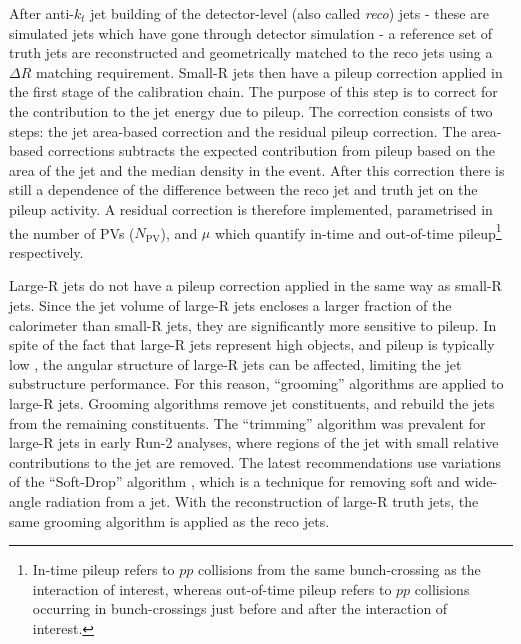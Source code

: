 After anti-$k_t$ jet building of the detector-level (also called \textit{reco}) jets - these are simulated jets which have gone through detector simulation - a reference set of truth jets are reconstructed and geometrically matched to the reco jets using a $\Delta R$ matching requirement. Small-R jets then have a pileup correction applied in the first stage of the calibration chain. The purpose of this step is to correct for the contribution to the jet energy due to pileup. The correction consists of two steps: the jet area-based correction and the residual pileup correction. The area-based corrections subtracts the expected contribution from pileup based on the area of the jet and the median \pt density in the event. After this correction there is still a dependence of the difference between the reco jet and truth jet \pt on the pileup activity. A residual correction is therefore implemented, parametrised in the number of PVs ($N_{\text{PV}}$), and $\mu$ which quantify in-time and out-of-time pileup\footnote{In-time pileup refers to $pp$ collisions from the same bunch-crossing as the interaction of interest, whereas out-of-time pileup refers to $pp$ collisions occurring in bunch-crossings just before and after the interaction of interest.} respectively.

Large-R jets do not have a pileup correction applied in the same way as small-R jets. Since the jet volume of large-R jets encloses a larger fraction of the calorimeter than small-R jets, they are significantly more sensitive to pileup. In spite of the fact that large-R jets represent high \pt objects, and pileup is typically low \pt, the angular structure of large-R jets can be affected, limiting the jet substructure performance. For this reason, ``grooming'' algorithms are applied to large-R jets. Grooming algorithms remove jet constituents, and rebuild the jets from the remaining constituents. The ``trimming'' algorithm \cite{Insitu:trimming} was prevalent for large-R jets in early Run-2 analyses, where regions of the jet with small relative contributions to the jet \pt are removed. The latest recommendations use variations of the ``Soft-Drop'' algorithm \cite{Insitu:softdrop}, which is a technique for removing soft and wide-angle radiation from a jet. With the reconstruction of large-R truth jets, the same grooming algorithm is applied as the reco jets.  

